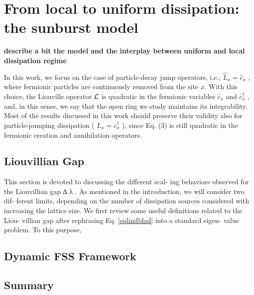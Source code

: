 \section{From local to uniform dissipation: the sunburst model}

{\bf describe a bit the model and the interplay between uniform and local dissipation 
regime}

In this work, we focus on the case of particle-decay jump
operators, i.e., $\hat L_x = \hat c_x$ , where fermionic particles are
continuously removed from the site $x$. With this choice,
the Liouville operator ${\cal L}$ is quadratic in the fermionic
variables $\hat c_x$ and $\hat c_x^\dagger$ , and, in this sense, we say that the
open ring we study maintains its integrability. Most of
the results discussed in this work should preserve their
validity also for particle-pumping dissipation ( $\hat L_x = c_x^\dagger$ ),
since Eq. (3) is still quadratic in the fermionic creation
and annihilation operators.



\subsection{Liouvillian Gap}

This section is devoted to discussing the different scal-
ing behaviors observed for the Liouvillian gap ∆ λ . As
mentioned in the introduction, we will consider two dif-
ferent limits, depending on the number of dissipation
sources considered with increasing the lattice size. We
first review some useful definitions related to the Liou-
villian gap after rephrasing Eq. \eqref{eqlindblad} into a standard eigen-
value problem. To this purpose,


\subsection{Dynamic FSS Framework}







\subsection{Summary}
